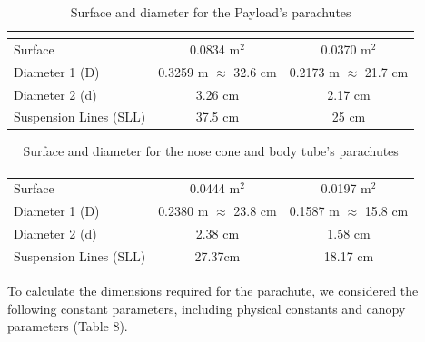 \begin{table}[htbp]
\centering
{}
\begin{tabular}{>{\centering\arraybackslash}lcc}
\rowcolor{DeepSkyBlue4}
\hline
\textbf{\color{white!50}{Parameter}} & \multicolumn{1}{|c|}{\textbf{\color{white!50}{1st Parachute}}}  & \textbf{\color{white!50}{2nd Parachute}} \\
\hline
Surface & 0.0834 m$^{2}$ & 0.0370 m$^{2}$\\
\rowcolor{LightCyan1!50}Diameter 1 (D) & 0.3259 m $\approx$ 32.6 cm & 0.2173 m $\approx$ 21.7 cm \\
Diameter 2 (d) & 3.26 cm & 2.17 cm\\
\rowcolor{LightCyan1!50}Suspension Lines (SLL) & 37.5 cm & 25 cm \\
\hline
\end{tabular}
\caption{Surface and diameter for the Payload's parachutes}
\end{table}

\begin{table}[htbp]
\centering
{}
\begin{tabular}{>{\centering\arraybackslash}lcc}
\rowcolor{DeepSkyBlue4}
\hline
\textbf{\color{white!50}{Parameter}} & \multicolumn{1}{|c|}{\textbf{\color{white!50}{3rd Parachute}}}  & \textbf{\color{white!50}{4th Parachute}} \\
\hline
Surface & 0.0444 m$^{2}$ & 0.0197 m$^{2}$\\
\rowcolor{LightCyan1!50}Diameter 1 (D) & 0.2380 m $\approx$ 23.8 cm & 0.1587 m $\approx$ 15.8 cm \\
Diameter 2 (d) & 2.38 cm & 1.58 cm\\
\rowcolor{LightCyan1!50}Suspension Lines (SLL) & 27.37cm & 18.17 cm \\
\hline
\end{tabular}
\caption{Surface and diameter for the nose cone and body tube's parachutes}
\end{table}

To calculate the dimensions required for the parachute, we considered the following constant parameters, including physical constants and canopy parameters (Table 8).

